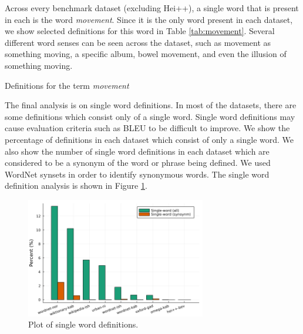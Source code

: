 \FloatBarrier
Across every benchmark dataset (excluding Hei++), a single word that is present
in each is the word \textit{movement}. Since it is the only word present in each
dataset, we show selected definitions for this word in Table \ref{tab:movement}. Several different word senses can be seen across the dataset, such as movement as something moving, a specific album, bowel movement, and even the illusion of something moving.

\begin{table}[h]
    \centering
    \caption{Definitions for the term \textit{movement}}
    
    \label{tab:movement}
\end{table}

The final analysis is on single word definitions. In most of the datasets, there
are some definitions which consist only of a single word. Single word
definitions may cause evaluation criteria such as BLEU to be difficult to
improve. We show the percentage of definitions in each dataset which consist of
only a single word. We also show the number of single word definitions in each
dataset which are considered to be a synonym of the word or phrase being
defined. We used WordNet synsets in order to identify synonymous words. The
single word definition analysis is shown in Figure \ref{fig:single_word_defs}.

\begin{figure}
    \centering
    \includegraphics[width=0.7\textwidth]{assets/plots/syn_counts.png}
    \caption{Plot of single word definitions.}
    \label{fig:single_word_defs}
\end{figure}
